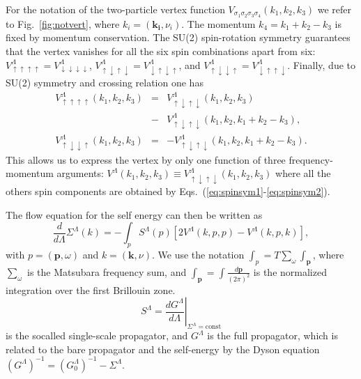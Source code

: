 For the notation of the two-particle vertex function $V_{\sigma_1\sigma_2\sigma_3\sigma_4}(k_1,k_2,k_3)$ we refer to Fig.~\ref{fig:notvert}, where $k_i=(\mathbf{k_i},\nu_i)$.
The momentum $k_4=k_1+k_2-k_3$ is fixed by momentum conservation.
The SU(2) spin-rotation symmetry guarantees that the vertex vanishes for all the six spin combinations apart from six:
$V^\Lambda_{\uparrow\uparrow\uparrow\uparrow} =
 V^\Lambda_{\downarrow\downarrow\downarrow\downarrow}$, 
$V^\Lambda_{\uparrow\downarrow\uparrow\downarrow} =
 V^\Lambda_{\downarrow\uparrow\downarrow\uparrow}$, and
$V^\Lambda_{\uparrow\downarrow\downarrow\uparrow } =
 V^\Lambda_{\downarrow\uparrow\uparrow\downarrow}$.   
Finally, due to SU(2) symmetry and crossing relation one has \cite{Rohringer2012} 
\begin{eqnarray}
\nonumber
V^\Lambda_{\uparrow\uparrow\uparrow\uparrow}(k_1,k_2,k_3) &=& V^\Lambda_{\uparrow\downarrow\uparrow\downarrow}(k_1,k_2,k_3)\\&-& V^\Lambda_{\uparrow\downarrow\uparrow\downarrow}(k_1,k_2,k_1+k_2-k_3),
\label{eq:spinsym1}
 \\ 
V^\Lambda_{\uparrow\downarrow\downarrow\uparrow}(k_1,k_2,k_3)& =& -V^\Lambda_{\uparrow\downarrow\uparrow\downarrow}(k_1,k_2,k_1+k_2-k_3).
\label{eq:spinsym2}
\end{eqnarray}
This allows us to express the vertex by only one function of three frequency-momentum arguments: $V^\Lambda(k_1,k_2,k_3)\equiv V^\Lambda_{\uparrow\downarrow\uparrow\downarrow}(k_1,k_2,k_3)$ where all the others spin components are obtained by Eqs.~(\ref{eq:spinsym1}-\ref{eq:spinsym2}).\cite{Husemann2009}

The flow equation for the self energy can then be written as \cite{Metzner2012} 
\begin{equation}
\frac{d}{d \Lambda} \Sigma^\Lambda(k)= -\int_p  S^\Lambda(p)\left[2V^\Lambda(k,p,p) -V^\Lambda(k,p,k)\right], 
\end{equation}
with $p=(\mathbf{p},\omega)$ and $k = (\mathbf{k},\nu)$.
We use the notation  $\int_{p} = T \sum_\omega \int_{\mathbf{p}}$, where $\sum_\omega$ is the Matsubara frequency sum, and $\int_{\mathbf{p}}=\int  \frac{d\mathbf{p}}{(2\pi)^2}$ is the normalized integration over the first Brillouin zone. 
\begin{equation}
 S^\Lambda = \left. \frac{dG^\Lambda}{d\Lambda}\right|_{\Sigma^{\Lambda}=\mathrm{const}} 
\end{equation}
is the socalled single-scale propagator, and ${G^\Lambda}$ is the full propagator, which is related to the bare propagator and the self-energy by the Dyson equation
$(G^\Lambda)^{-1} = (G_0^\Lambda)^{-1} - \Sigma^\Lambda$. 
  
